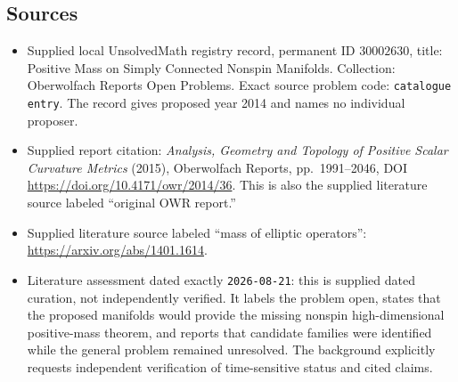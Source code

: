 \documentclass[11pt]{article}
\begin{document}
\subsection{Sources}
\begin{itemize}
\item Supplied local UnsolvedMath registry record, permanent ID \(30002630\), title: Positive Mass on Simply Connected Nonspin Manifolds. Collection: Oberwolfach Reports Open Problems. Exact source problem code: \texttt{catalogue entry}. The record gives proposed year 2014 and names no individual proposer.
\item Supplied report citation: \emph{Analysis, Geometry and Topology of Positive Scalar Curvature Metrics} (2015), Oberwolfach Reports, pp.~1991--2046, DOI \url{https://doi.org/10.4171/owr/2014/36}. This is also the supplied literature source labeled ``original OWR report.''
\item Supplied literature source labeled ``mass of elliptic operators'': \url{https://arxiv.org/abs/1401.1614}.
\item Literature assessment dated exactly \texttt{2026-08-21}: this is supplied dated curation, not independently verified. It labels the problem open, states that the proposed manifolds would provide the missing nonspin high-dimensional positive-mass theorem, and reports that candidate families were identified while the general problem remained unresolved. The background explicitly requests independent verification of time-sensitive status and cited claims.
\end{itemize}
\end{document}
